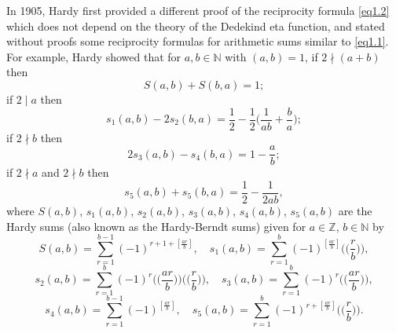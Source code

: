 \documentclass[reqno]{amsart}
\numberwithin{equation}{section}
\begin{document}
In 1905, Hardy \cite{hardy} first provided a different proof of the reciprocity formula \eqref{eq1.2} which does not depend on the theory of the Dedekind eta function, and stated without proofs some reciprocity formulas for arithmetic sums similar to \eqref{eq1.1}. For example, Hardy \cite[pp. 122--123]{hardy} showed that for $a,b\in\mathbb{N}$ with $(a,b)=1$, if $2\nmid(a+b)$ then
\begin{equation}\label{eq1.3}
S(a,b)+S(b,a)=1;
\end{equation}
if $2\mid a$ then
\begin{equation}\label{eq1.4}
s_{1}(a,b)-2s_{2}(b,a)=\frac{1}{2}-\frac{1}{2}\biggl(\frac{1}{ab}+\frac{b}{a}\biggl);
\end{equation}
if $2\nmid b$ then
\begin{equation}\label{eq1.5}
2s_{3}(a,b)-s_{4}(b,a)=1-\frac{a}{b};
\end{equation}
if $2\nmid a$ and $2\nmid b$ then
\begin{equation}\label{eq1.6}
s_{5}(a,b)+s_{5}(b,a)=\frac{1}{2}-\frac{1}{2ab},
\end{equation}
where $S(a,b)$, $s_{1}(a,b)$, $s_{2}(a,b)$, $s_{3}(a,b)$, $s_{4}(a,b)$, $s_{5}(a,b)$ are the Hardy sums (also known as the Hardy-Berndt sums) given for $a\in\mathbb{Z}$, $b\in\mathbb{N}$ by
\begin{equation*}
S(a,b)=\sum_{r=1}^{b-1}(-1)^{r+1+[\frac{ar}{b}]},\quad
s_{1}(a,b)=\sum_{r=1}^{b}(-1)^{[\frac{ar}{b}]}\biggl(\biggl(\frac{r}{b}\biggl)\biggl),
\end{equation*}
\begin{equation*}
s_{2}(a,b)=\sum_{r=1}^{b}(-1)^{r}\biggl(\biggl(\frac{ar}{b}\biggl)\biggl)\biggl(\biggl(\frac{r}{b}\biggl)\biggl),\quad
s_{3}(a,b)=\sum_{r=1}^{b}(-1)^{r}\biggl(\biggl(\frac{ar}{b}\biggl)\biggl),
\end{equation*}
\begin{equation*}
s_{4}(a,b)=\sum_{r=1}^{b-1}(-1)^{[\frac{ar}{b}]},\quad
s_{5}(a,b)=\sum_{r=1}^{b}(-1)^{r+[\frac{ar}{b}]}\biggl(\biggl(\frac{r}{b}\biggl)\biggl).
\end{equation*}
\end{document}

